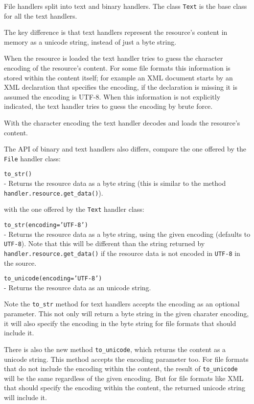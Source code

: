 File handlers split into text and binary handlers. The class {\tt Text}
is the base class for all the text handlers.

The key difference is that text handlers represent the resource's content
in memory as a unicode string, instead of just a byte string.

When the resource is loaded the text handler tries to guess the character
encoding of the resource's content. For some file formats this information
is stored within the content itself; for example an XML document starts
by an XML declaration that specifies the encoding, if the declaration is
missing it is assumed the encoding is UTF-8. When this information is not
explicitly indicated, the text handler tries to guess the encoding by
brute force.

With the character encoding the text handler decodes and loads the resource's
content.

The API of binary and text handlers also differs, compare the one offered
by the {\tt File} handler class:

\begin{api}
  {\tt to\_str()}\\
  - Returns the resource data as a byte string (this is similar to the
    method {\tt handler.resource.get\_data()}).
\end{api}

with the one offered by the {\tt Text} handler class:

\begin{api}
  {\tt to\_str(encoding='UTF-8')}\\
  - Returns the resource data as a byte string, using the given encoding
  (defaults to {\tt UTF-8}). Note that this will be different than the
  string returned by {\tt handler.resource.get\_data()} if the resource
  data is not encoded in {\tt UTF-8} in the source.

  {\tt to\_unicode(encoding='UTF-8')}\\
  - Returns the resource data as an unicode string.
\end{api}

Note the {\tt to\_str} method for text handlers accepts the encoding as
an optional parameter. This not only will return a byte string in the
given charater encoding, it will also specify the encoding in the byte
string for file formats that should include it.

There is also the new method {\tt to\_unicode}, which returns the content
as a unicode string. This method accepts the encoding parameter too. For
file formats that do not include the encoding within the content, the
result of {\tt to\_unicode} will be the same regardless of the given
encoding. But for file formats like XML that should specify the encoding
within the content, the returned unicode string will include it.



